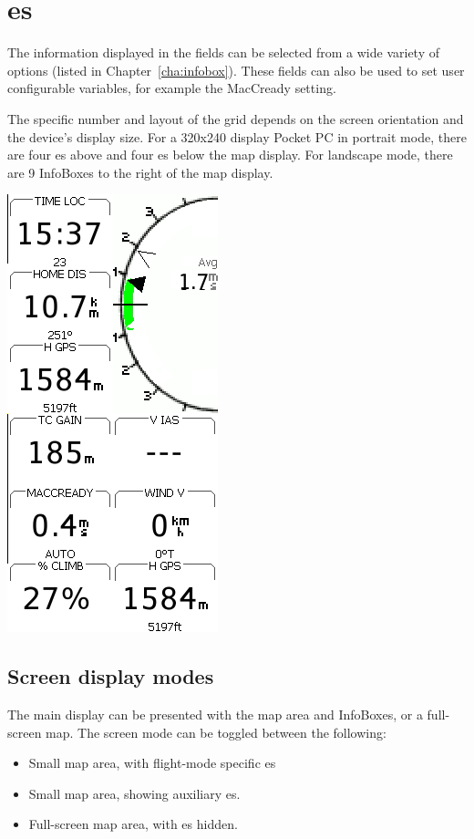 \documentclass[a4paper,12pt]{refrep}
\begin{document}
\section{{\InfoBox}es}

The information displayed in the {\InfoBox} fields can be selected from a
wide variety of options (listed in Chapter~\ref{cha:infobox}). These
fields can also be used to set user configurable variables, for example
the MacCready setting.

The specific number and layout of the {\InfoBox} grid depends on the
screen orientation and the device's display size.  For a 320x240 display
Pocket PC in portrait mode, there are four {\InfoBox}es above and four
{\InfoBox}es below the map display. For landscape mode, there are 9
InfoBoxes to the right of the map display.

\begin{center}
\includegraphics[angle=0,width=0.35\linewidth,keepaspectratio='true']{figures/infoboxes.png}
\end{center}

\subsection*{Screen display modes}

The main display can be presented with the map area and InfoBoxes, or
a full-screen map.  The screen mode can be toggled between the following:
\begin{itemize}
\item Small map area, with flight-mode specific {\InfoBox}es
\item Small map area, showing auxiliary {\InfoBox}es.
\item Full-screen map area, with {\InfoBox}es hidden.
\end{itemize}
\end{document}
